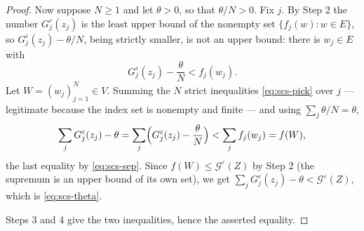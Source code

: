 \begin{proof}
Now suppose $N\ge1$ and let $\theta>0$, so that $\theta/N>0$. Fix $j$. By Step 2
the number $G_j^\varepsilon(z_j)$ is the least upper bound of the nonempty set
$\{f_j(w):w\in E\}$, so $G_j^\varepsilon(z_j)-\theta/N$, being strictly smaller,
is not an upper bound: there is $w_j\in E$ with
\begin{equation}\label{eq:scs-pick}
  G_j^\varepsilon(z_j)-\frac{\theta}{N}<f_j(w_j).
\end{equation}
Let $W=(w_j)_{j=1}^N\in V$. Summing the $N$ strict inequalities
\eqref{eq:scs-pick} over $j$ --- legitimate because the index set is nonempty
and finite --- and using $\sum_j\theta/N=\theta$,
\[
  \sum_jG_j^\varepsilon(z_j)-\theta
   =\sum_j\Bigl(G_j^\varepsilon(z_j)-\frac{\theta}{N}\Bigr)
   <\sum_jf_j(w_j)=f(W),
\]
the last equality by \eqref{eq:scs-sep}. Since $f(W)\le\mathcal
G^\varepsilon(Z)$ by Step 2 (the supremum is an upper bound of its own set), we
get $\sum_jG_j^\varepsilon(z_j)-\theta<\mathcal G^\varepsilon(Z)$, which is
\eqref{eq:scs-theta}.

Steps 3 and 4 give the two inequalities, hence the asserted equality.
\end{proof}
